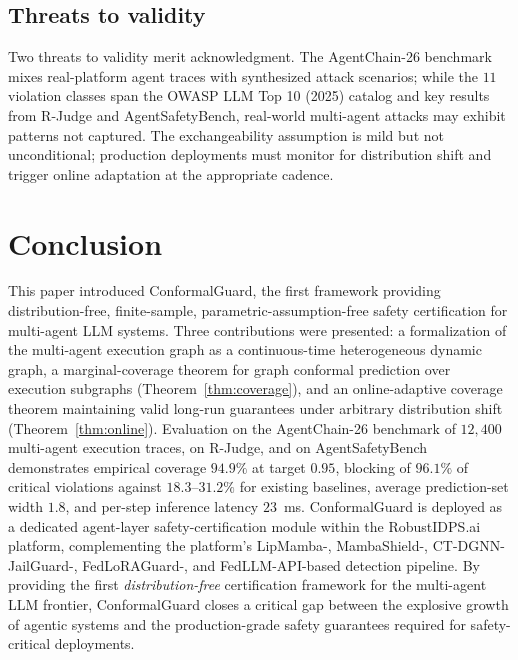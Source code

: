 \documentclass[12pt,a4paper]{article}
\theoremstyle{definition}
\theoremstyle{remark}
\newcommand{\modelname}{ConformalGuard}
\newcommand{\benchname}{AgentChain-26}
\begin{document}
\subsection{Threats to validity}

Two threats to validity merit acknowledgment. The \benchname{} benchmark mixes real-platform agent traces with synthesized attack scenarios; while the $11$ violation classes span the OWASP LLM Top 10 (2025) catalog and key results from R-Judge and AgentSafetyBench, real-world multi-agent attacks may exhibit patterns not captured. The exchangeability assumption is mild but not unconditional; production deployments must monitor for distribution shift and trigger online adaptation at the appropriate cadence.


\section{Conclusion}
\label{sec:conclusion}

This paper introduced \modelname{}, the first framework providing distribution-free, finite-sample, parametric-assumption-free safety certification for multi-agent LLM systems. Three contributions were presented: a formalization of the multi-agent execution graph as a continuous-time heterogeneous dynamic graph, a marginal-coverage theorem for graph conformal prediction over execution subgraphs (Theorem~\ref{thm:coverage}), and an online-adaptive coverage theorem maintaining valid long-run guarantees under arbitrary distribution shift (Theorem~\ref{thm:online}). Evaluation on the \benchname{} benchmark of $12{,}400$ multi-agent execution traces, on R-Judge, and on AgentSafetyBench demonstrates empirical coverage $94.9\%$ at target $0.95$, blocking of $96.1\%$ of critical violations against $18.3$--$31.2\%$ for existing baselines, average prediction-set width $1.8$, and per-step inference latency $23$~ms. \modelname{} is deployed as a dedicated agent-layer safety-certification module within the RobustIDPS.ai platform, complementing the platform's LipMamba-, MambaShield-, CT-DGNN-JailGuard-, FedLoRAGuard-, and FedLLM-API-based detection pipeline. By providing the first \emph{distribution-free} certification framework for the multi-agent LLM frontier, \modelname{} closes a critical gap between the explosive growth of agentic systems and the production-grade safety guarantees required for safety-critical deployments.
\end{document}
